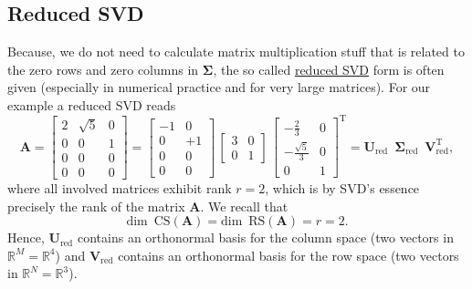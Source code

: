\documentclass[a4paper, 11pt]{scrartcl}
\begin{document}
\subsection{Reduced SVD}
Because, we do not need to calculate matrix multiplication stuff that is related to the zero rows and zero columns in $\bm{\Sigma}$, the so called \underline{reduced SVD} form is often given (especially in numerical practice and for very large matrices). For our example a reduced SVD reads
$$
\bm{A} =
\begin{bmatrix}
2 & \sqrt{5} & 0\\
0 & 0 & 1\\
0 & 0 & 0\\
0 & 0 & 0
\end{bmatrix}
=
\begin{bmatrix}
-1 & 0\\
0 & +1\\
0 & 0\\
0 & 0
\end{bmatrix}
\,
\begin{bmatrix}
3 & 0\\
0 &  1
\end{bmatrix}
\,
\begin{bmatrix}
-\frac{2}{3} & 0\\
-\frac{\sqrt{5}}{3} & 0\\
0 & 1
\end{bmatrix}^\mathrm{T}
= \bm{U}_\text{red} \,\,\, \bm{\Sigma}_\text{red} \,\,\, \bm{V}_\text{red}^\mathrm{T},
$$
where all involved matrices exhibit rank $r=2$, which is by SVD's essence precisely the rank of the matrix $\bm{A}$.
%
We recall that
$$
\text{dim}\,\,\, \text{CS}(\bm{A}) = \text{dim}\,\,\, \text{RS}(\bm{A}) = r = 2.
$$
Hence,
$\bm{U}_\text{red}$ contains an orthonormal basis for the column space (two vectors in $\mathbb{R}^M=\mathbb{R}^4$) and $\bm{V}_\text{red}$ contains an orthonormal basis for the row space (two vectors in $\mathbb{R}^N=\mathbb{R}^3$).
%
\end{document}
